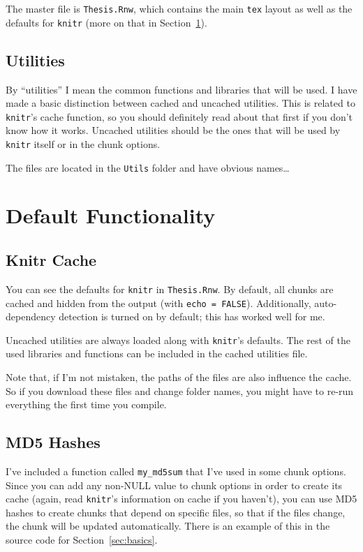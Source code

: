 The master file is \texttt{Thesis.Rnw}, which contains the main \texttt{tex} layout as well as the defaults for \texttt{knitr} (more on that in Section~\ref{sec:default-func}).

\subsection{Utilities}
\label{sec:utilities}

By ``utilities'' I mean the common \R{} functions and libraries that will be used. I have made a basic distinction between cached and uncached utilities. This is related to \texttt{knitr}'s cache function, so you should definitely read about that first if you don't know how it works. Uncached utilities should be the ones that will be used by \texttt{knitr} itself or in the chunk options.

The files are located in the \texttt{Utils} folder and have obvious names\dots

\section{Default Functionality}
\label{sec:default-func}

\subsection{Knitr Cache}

You can see the defaults for \texttt{knitr} in \texttt{Thesis.Rnw}. By default, all chunks are cached and hidden from the output (with \texttt{echo = FALSE}). Additionally, auto-dependency detection is turned on by default; this has worked well for me.

Uncached utilities are always loaded along with \texttt{knitr}'s defaults. The rest of the used libraries and functions can be included in the cached utilities file.

Note that, if I'm not mistaken, the paths of the files are also influence the cache. So if you download these files and change folder names, you might have to re-run everything the first time you compile.

\subsection{MD5 Hashes}

I've included a function called \texttt{my\_md5sum} that I've used in some chunk options. Since you can add any non-NULL value to chunk options in order to create its cache (again, read \texttt{knitr}'s information on cache if you haven't), you can use MD5 hashes to create chunks that depend on specific files, so that if the files change, the chunk will be updated automatically. There is an example of this in the source code for Section~\ref{sec:basics}.

